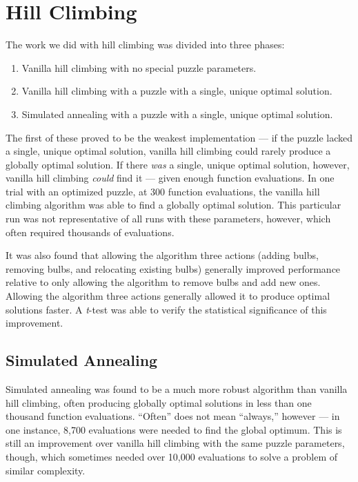 \documentclass{article} %
\begin{document}
\section{Hill Climbing}

The work we did with hill climbing was divided into three phases:

\begin{enumerate}
\item Vanilla hill climbing with no special puzzle parameters.
\item Vanilla hill climbing with a puzzle with a single, unique optimal solution.
\item Simulated annealing with a puzzle with a single, unique optimal solution.
\end{enumerate}

The first of these proved to be the weakest implementation — if the puzzle lacked a single, unique optimal solution, vanilla hill climbing could rarely produce a globally optimal solution. If there \textit{was} a single, unique optimal solution, however, vanilla hill climbing \textit{could} find it — given enough function evaluations. In one trial with an optimized puzzle, at 300 function evaluations, the vanilla hill climbing algorithm was able to find a globally optimal solution. This particular run was not representative of all runs with these parameters, however, which often required thousands of evaluations.

It was also found that allowing the algorithm three actions (adding bulbs, removing bulbs, and relocating existing bulbs) generally improved performance relative to only allowing the algorithm to remove bulbs and add new ones. Allowing the algorithm three actions generally allowed it to produce optimal solutions faster. A \textit{t}-test was able to verify the statistical significance of this improvement.

\subsection{Simulated Annealing}

Simulated annealing was found to be a much more robust algorithm than vanilla hill climbing, often producing globally optimal solutions in less than one thousand function evaluations. “Often” does not mean “always,” however — in one instance, 8,700 evaluations were needed to find the global optimum. This is still an improvement over vanilla hill climbing with the same puzzle parameters, though, which sometimes needed over 10,000 evaluations to solve a problem of similar complexity.
\end{document}
